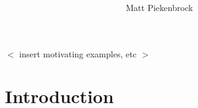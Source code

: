 \documentclass[10pt]{article}
\title{\vspace{-2.0em} \vspace{-0.5em}}
\author{Matt Piekenbrock}
\date{}
\begin{document}
\noindent

$<$ insert motivating examples, etc $>$


\section{Introduction}




\end{document}
